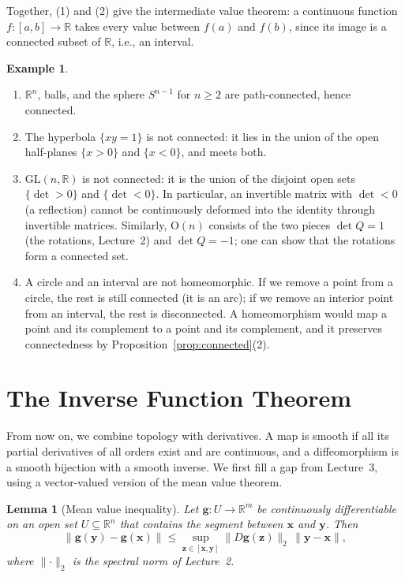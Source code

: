 \documentclass[11pt]{article}
\newcommand{\norm}[1]{\lVert #1 \rVert}
\theoremstyle{definition}
\newtheorem{example}[definition]{Example}
\theoremstyle{plain}
\newtheorem{lemma}[definition]{Lemma}
\theoremstyle{remark}
\begin{document}
Together, (1) and (2) give the intermediate value theorem: a continuous function $f: [a, b] \to \mathbb{R}$ takes every value between $f(a)$ and $f(b)$, since its image is a connected subset of $\mathbb{R}$, i.e., an interval.

\begin{example}\label{ex:connected}
    \begin{enumerate}
        \item $\mathbb{R}^n$, balls, and the sphere $S^{n-1}$ for $n \geq 2$ are path-connected, hence connected.
        \item The hyperbola $\{xy = 1\}$ is not connected: it lies in the union of the open half-planes $\{x > 0\}$ and $\{x < 0\}$, and meets both.
        \item $\mathrm{GL}(n, \mathbb{R})$ is not connected: it is the union of the disjoint open sets $\{\det > 0\}$ and $\{\det < 0\}$. In particular, an invertible matrix with $\det < 0$ (a reflection) cannot be continuously deformed into the identity through invertible matrices. Similarly, $\mathrm{O}(n)$ consists of the two pieces $\det Q = 1$ (the rotations, Lecture~2) and $\det Q = -1$; one can show that the rotations form a connected set.
        \item A circle and an interval are not homeomorphic. If we remove a point from a circle, the rest is still connected (it is an arc); if we remove an interior point from an interval, the rest is disconnected. A homeomorphism would map a point and its complement to a point and its complement, and it preserves connectedness by Proposition~\ref{prop:connected}(2).
    \end{enumerate}
\end{example}

\section{The Inverse Function Theorem}\label{sec:inverse}

From now on, we combine topology with derivatives. A map is smooth if all its partial derivatives of all orders exist and are continuous, and a diffeomorphism is a smooth bijection with a smooth inverse. We first fill a gap from Lecture~3, using a vector-valued version of the mean value theorem.

\begin{lemma}[Mean value inequality]\label{lem:mean-value}
    Let $\mathbf{g}: U \to \mathbb{R}^m$ be continuously differentiable on an open set $U \subseteq \mathbb{R}^n$ that contains the segment between $\mathbf{x}$ and $\mathbf{y}$. Then
    \[\norm{\mathbf{g}(\mathbf{y}) - \mathbf{g}(\mathbf{x})} \leq \sup_{\mathbf{z} \in [\mathbf{x}, \mathbf{y}]} \norm{D\mathbf{g}(\mathbf{z})}_2 \, \norm{\mathbf{y} - \mathbf{x}},\]
    where $\norm{\cdot}_2$ is the spectral norm of Lecture~2.
\end{lemma}
\end{document}
